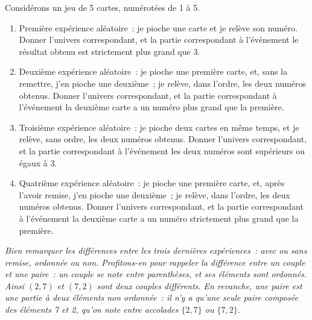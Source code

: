 





\begin{exo} Considérons un jeu de 5 cartes, numérotées de 1 à 5. 
\begin{enumerate}
\item
Première expérience aléatoire~: je pioche une carte et je relève son
numéro. Donner l'univers correspondant, et la partie correspondant à
l'événement \og le résultat obtenu est strictement plus grand que 3\fg.
\item
Deuxième expérience aléatoire~: je pioche une première carte, et,
sans la remettre, j'en pioche une deuxième~; je relève, dans l'ordre,
les deux numéros obtenus. Donner l'univers correspondant, et la partie correspondant à
l'événement \og la deuxième carte a un numéro plus grand que la
première\fg.
\item
Troisième expérience aléatoire~: je pioche deux cartes en même
temps, et je relève, sans ordre, les deux numéros obtenus. Donner l'univers correspondant, et la partie correspondant à
l'événement \og les deux numéros sont supérieurs ou égaux à 3\fg.
\item
Quatrième expérience aléatoire~: je pioche une première carte, et,
après l'avoir remise, j'en pioche une deuxième~; je relève, dans l'ordre,
les deux numéros obtenus. Donner l'univers correspondant, et la partie correspondant à
l'événement \og la deuxième carte a un numéro strictement plus grand que la
première\fg.
\end{enumerate}

 \emph{Bien remarquer les différences entre les trois
dernières expériences~: avec ou sans remise, ordonnée ou
non. Profitons-en pour rappeler la différence entre un  \emph{couple} et
une \emph{paire}~: un couple se note entre parenthèses, et ses
éléments sont ordonnés. Ainsi $(2,7)$ et $(7,2)$ sont deux couples
différents. En revanche, une paire est une partie à deux éléments
non ordonnée~: il n'y a qu'une seule paire composée des éléments 7 et
2, qu'on note entre accolades $\{2,7\}$ ou $\{7,2\}$.}
\end{exo}


